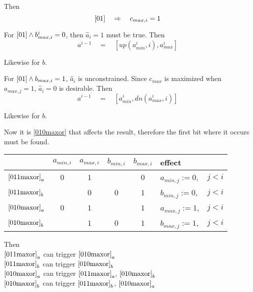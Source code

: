 \documentclass{article}
\begin{document}
Then
\begin{equation*}
\eqref{01} \quad \Rightarrow \quad c_{max,i} = 1
\end{equation*}

For $\eqref{01} \wedge b^i_{max,i} = 0$, then $ \hat a_i = 1$ must be true. 
Then 
\begin{equation}\label{011maxor} 
a^{i-1} \quad = \quad [up(a^i_{min}, i), a^i_{max}]
\end{equation}

Likewise for $b$.
\vspace{10pt}

For $\eqref{01} \wedge b_{max,i} = 1$, $\hat a_i$ is unconstrained.
Since $c_{max}$ is maximized when $a_{max,j} = 1$, 
$\hat a_i = 0$ is desirable. Then
\begin{equation}\label{010maxor} 
a^{i-1} \quad = \quad [a^i_{min}, dn(a^i_{max},i)]
\end{equation}

Likewise for $b$.
\vspace{10pt}

Now it is \eqref{010maxor} that affects the result, therefore the first
bit where it occurs must be found.
\vspace{10pt}

\begin{tabular}{l|c|c|c|c|l r}
& $a_{min,i}$ & $a_{max,i}$ & $b_{min,i}$ & $b_{max,i}$ & effect &\\
\hline
$\eqref{011maxor}_a$ & $0$ & $1$ & & $0$ & $a_{min,j} := 0$, \;& $j < i$ \\
\hline
$\eqref{011maxor}_b$ & & $0$ & $0$ & $1$ & $b_{min,j} := 0$, \;& $j < i$ \\
\hline
$\eqref{010maxor}_a$ & $0$ & $1$ & & $1$ & $a_{max,j} := 1$, \;& $j < i$ \\
\hline
$\eqref{010maxor}_b$ & & $1$ & $0$ & $1$ & $b_{max,j} := 1$, \;& $j < i$ \\
\end{tabular}
\vspace{10pt}

Then\\
$\eqref{011maxor}_a$ \quad can trigger \quad $\eqref{010maxor}_a$\\
$\eqref{011maxor}_b$ \quad can trigger \quad $\eqref{010maxor}_b$\\
$\eqref{010maxor}_a$ \quad can trigger \quad $\eqref{011maxor}_a$,
$\eqref{010maxor}_b$ \\
$\eqref{010maxor}_b$ \quad can trigger \quad $\eqref{011maxor}_b$,
$\eqref{010maxor}_a$ \\
\end{document}

